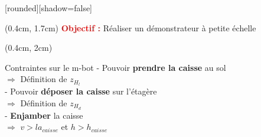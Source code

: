 \documentclass[french]{beamer}
\begin{document}
\begin{frame}
[rounded][shadow=false]
{\scriptsize
\begin{textblock*}{10cm}(0.4cm, 1.7cm)
{\small \textcolor{red}{\textbf{Objectif :}} Réaliser un démonstrateur à petite échelle}
\end{textblock*}


\begin{textblock*}{6.5cm}(0.4cm, 2cm)
\begin{block}{Contraintes sur le m-bot}
- Pouvoir \textbf{prendre la caisse} au sol\\
\hspace{0.5cm}$\Rightarrow$ Définition de $z_{H_l}$\\ %
\vspace{0.25cm}
- Pouvoir \textbf{déposer la caisse} sur l'étagère\\ 
\hspace{0.5cm}$\Rightarrow$ Définition de $z_{H_d}$\\ %
\vspace{0.25cm}
- \textbf{Enjamber} la caisse\\ 
\hspace{0.5cm}$\Rightarrow$ $v>la_{caisse}$ et $h>h_{caisse}$\\ %
\end{block}
\end{textblock*}

}


\end{frame}
\end{document}
